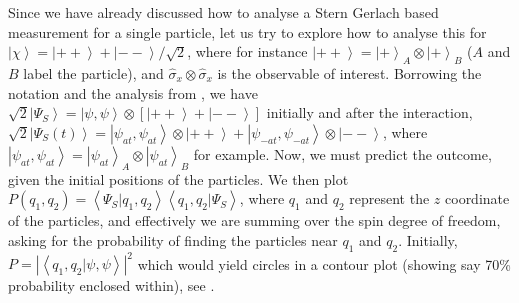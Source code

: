 Since we have already discussed how to analyse a Stern Gerlach based
measurement for a single particle, let us try to explore how to analyse
this for $\left|\chi\right\rangle =\left|++\right\rangle +\left|--\right\rangle /\sqrt{2}$,
where for instance $\left|++\right\rangle =\left|+\right\rangle _{A}\otimes\left|+\right\rangle _{B}$
($A$ and $B$ label the particle), and $\hat{\sigma}_{x}\otimes\hat{\sigma}_{x}$
is the observable of interest. Borrowing the notation and the analysis
from , we have $\sqrt{2}\left|\Psi_{S}\right\rangle =\left|\psi,\psi\right\rangle \otimes\left[\left|++\right\rangle +\left|--\right\rangle \right]$
initially and after the interaction, $\sqrt{2}\left|\Psi_{S}(t)\right\rangle =\left|\psi_{at},\psi_{at}\right\rangle \otimes\left|++\right\rangle +\left|\psi_{-at},\psi_{-at}\right\rangle \otimes\left|--\right\rangle $,
where $\left|\psi_{at},\psi_{at}\right\rangle =\left|\psi_{at}\right\rangle _{A}\otimes\left|\psi_{at}\right\rangle _{B}$
for example. Now, we must predict the outcome, given the initial positions
of the particles. We then plot $P(q_{1},q_{2})=\left\langle \Psi_{S}|q_{1},q_{2}\right\rangle \left\langle q_{1},q_{2}|\Psi_{S}\right\rangle $,
where $q_{1}$ and $q_{2}$ represent the $z$ coordinate of the particles,
and effectively we are summing over the spin degree of freedom, asking
for the probability of finding the particles near $q_{1}$ and $q_{2}$.
Initially, $P=\left|\left\langle q_{1},q_{2}|\psi,\psi\right\rangle \right|^{2}$
which would yield circles in a contour plot (showing say 70\% probability
enclosed within), see . 
